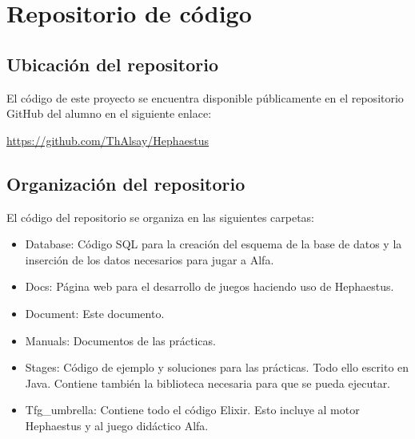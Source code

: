 \chapter{Repositorio de código}
\label{appendex:repositorio}

\section{Ubicación del repositorio}
El código de este proyecto se encuentra disponible públicamente en el repositorio GitHub del alumno en el siguiente enlace:\newline

\strut\hspace{\parskip}\url{https://github.com/ThAlsay/Hephaestus}

\section{Organización del repositorio}
El código del repositorio se organiza en las siguientes carpetas:

\begin{itemize}
	\item Database: Código SQL para la creación del esquema de la base de datos y la inserción de los datos necesarios para jugar a Alfa.
	\item Docs: Página web para el desarrollo de juegos haciendo uso de Hephaestus.
	\item Document: Este documento.
	\item Manuals: Documentos de las prácticas.
	\item Stages: Código de ejemplo y soluciones para las prácticas. Todo ello escrito en Java. Contiene también la biblioteca necesaria para que se pueda ejecutar.
	\item Tfg\_umbrella: Contiene todo el código Elixir. Esto incluye al motor Hephaestus y al juego didáctico Alfa.
\end{itemize}
